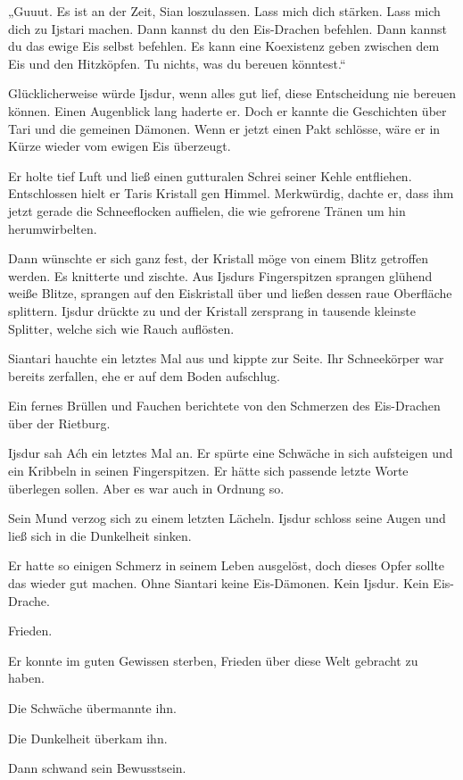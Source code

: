 „Guuut. Es ist an der Zeit, Sian loszulassen. Lass mich dich stärken. Lass mich dich zu Ijstari machen. Dann kannst du den Eis-Drachen befehlen. Dann kannst du das ewige Eis selbst befehlen. Es kann eine Koexistenz geben zwischen dem Eis und den Hitzköpfen. Tu nichts, was du bereuen könntest.“

Glücklicherweise würde Ijsdur, wenn alles gut lief, diese Entscheidung nie bereuen können. Einen Augenblick lang haderte er. Doch er kannte die Geschichten über Tari und die gemeinen Dämonen. Wenn er jetzt einen Pakt schlösse, wäre er in Kürze wieder vom ewigen Eis überzeugt.

Er holte tief Luft und ließ einen gutturalen Schrei seiner Kehle entfliehen. Entschlossen hielt er Taris Kristall gen Himmel. Merkwürdig, dachte er, dass ihm jetzt gerade die Schneeflocken auffielen, die wie gefrorene Tränen um hin herumwirbelten.

Dann wünschte er sich ganz fest, der Kristall möge von einem Blitz getroffen werden. Es knitterte und zischte. Aus Ijsdurs Fingerspitzen sprangen glühend weiße Blitze, sprangen auf den Eiskristall über und ließen dessen raue Oberfläche splittern. Ijsdur drückte zu und der Kristall zersprang in tausende kleinste Splitter, welche sich wie Rauch auflösten.

Siantari hauchte ein letztes Mal aus und kippte zur Seite. Ihr Schneekörper war bereits zerfallen, ehe er auf dem Boden aufschlug.

Ein fernes Brüllen und Fauchen berichtete von den Schmerzen des Eis-Drachen über der Rietburg.

Ijsdur sah Aćh ein letztes Mal an. Er spürte eine Schwäche in sich aufsteigen und ein Kribbeln in seinen Fingerspitzen. Er hätte sich passende letzte Worte überlegen sollen. Aber es war auch in Ordnung so.

Sein Mund verzog sich zu einem letzten Lächeln. Ijsdur schloss seine Augen und ließ sich in die Dunkelheit sinken.

Er hatte so einigen Schmerz in seinem Leben ausgelöst, doch dieses Opfer sollte das wieder gut machen. Ohne Siantari keine Eis-Dämonen. Kein Ijsdur. Kein Eis-Drache.

Frieden.

Er konnte im guten Gewissen sterben, Frieden über diese Welt gebracht zu haben.

Die Schwäche übermannte ihn.

Die Dunkelheit überkam ihn.

Dann schwand sein Bewusstsein.\bigskip







